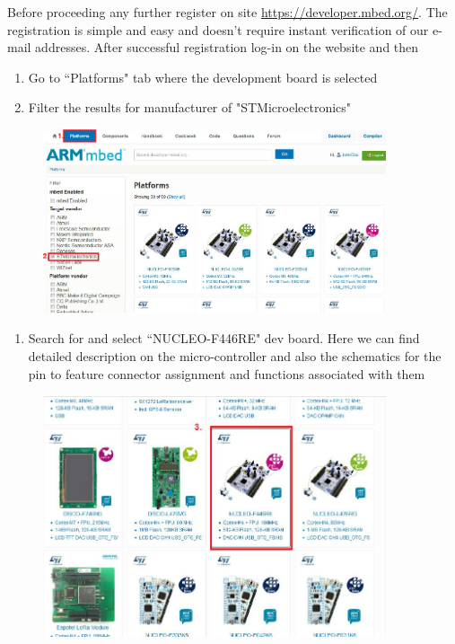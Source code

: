 \documentclass[a4paper]{article}
\begin{document}
Before proceeding any further register on site \url{https://developer.mbed.org/}. The registration is simple and easy
and doesn't require instant verification of our e-mail addresses. After successful registration log-in on the website
and then
\begin{enumerate}
    \item Go to ``Platforms" tab where the development board is selected
    \item Filter the results for manufacturer of "STMicroelectronics"
\end{enumerate}
\begin{figure}[H]
    \centering
    \includegraphics[width=0.9\textwidth]{figures/mbed-platform.png}
\end{figure}
\begin{enumerate}[resume]
    \item Search for and select ``NUCLEO-F446RE" dev board. Here we can find detailed description on the micro-controller
          and also the schematics for the pin to feature connector assignment and functions associated with them
\end{enumerate}
\begin{figure}[H]
    \centering
    \includegraphics[width=0.9\textwidth]{figures/mbed-nucleo.png}
\end{figure}
\end{document}
